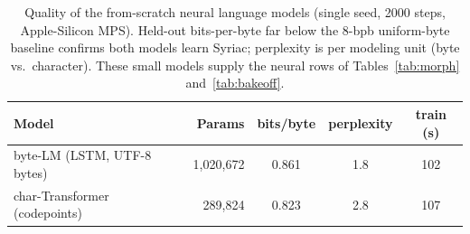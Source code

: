 \begin{table}[t]
  \centering
  \begin{tabular}{lrccc}
    \toprule
    \textbf{Model} & \textbf{Params} & \textbf{bits/byte} & \textbf{perplexity} & \textbf{train (s)} \\
    \midrule
    byte-LM (LSTM, UTF-8 bytes)        & 1{,}020{,}672 & 0.861 & 1.8 & 102 \\
    char-Transformer (codepoints)      & 289{,}824     & 0.823 & 2.8 & 107 \\
    \bottomrule
  \end{tabular}
  \caption{Quality of the from-scratch neural language models (single seed, 2000
  steps, Apple-Silicon MPS). Held-out bits-per-byte far below the 8-bpb
  uniform-byte baseline confirms both models learn Syriac; perplexity is per
  modeling unit (byte vs.\ character). These small models supply the neural rows
  of Tables~\ref{tab:morph} and~\ref{tab:bakeoff}.}
  \label{tab:lm}
\end{table}
